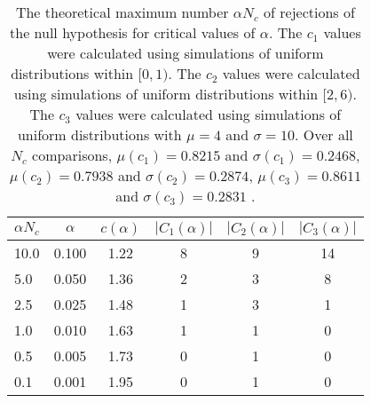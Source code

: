 \begin{table}[h!]
\begin{center}
\begin{tabular}{| l | c | c | c | c | c |}\hline
$\alpha N_c$ & $\alpha$ & $c(\alpha)$ & $|C_1(\alpha)|$ & $|C_2(\alpha)|$ & $|C_3(\alpha)|$ \\\hline\hline
10.0 & 0.100 & 1.22 & 8 & 9 & 14 \\\hline
5.0 & 0.050 & 1.36 & 2 & 3 & 8 \\\hline
2.5 & 0.025 & 1.48 & 1 & 3 & 1 \\\hline
1.0 & 0.010 & 1.63 & 1 & 1 & 0 \\\hline
0.5 & 0.005 & 1.73 & 0 & 1 & 0 \\\hline
0.1 & 0.001 & 1.95 & 0 & 1 & 0 \\\hline
\end{tabular}
\caption{The theoretical maximum number $\alpha N_c$ of rejections
        of the null hypothesis for critical values of $\alpha$.
        The $c_1$ values were calculated using simulations of uniform distributions within $[0,1)$.
        The $c_2$ values were calculated using simulations of uniform distributions within $[2,6)$.
        The $c_3$ values were calculated using simulations of uniform distributions with $\mu=4$ and $\sigma=10$.
        Over all $N_c$ comparisons,
         $\mu(c_1)=0.8215$ and $\sigma(c_1)=0.2468$,
         $\mu(c_2)=0.7938$ and $\sigma(c_2)=0.2874$,
         $\mu(c_3)=0.8611$ and $\sigma(c_3)=0.2831$ .
        }
\end{center}
\end{table}